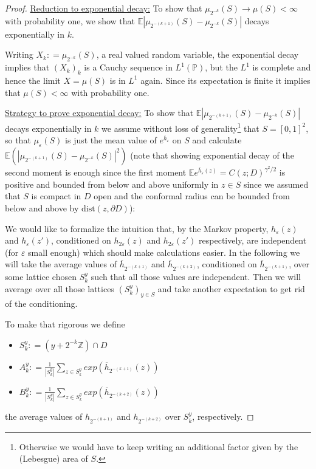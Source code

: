 \documentclass[11pt,reqno]{amsart}
\numberwithin{equation}{section}
\newcommand{\deq}{\mathrel{\mathop:}=}
\newcommand{\eps}{\varepsilon}
\begin{document}
\begin{proof}
	
	\underline{Reduction to exponential decay:} To show that $\mu_{2^{-k}}(S)\rightarrow\mu(S)<\infty$ with probability one, we show that $\mathbb E|\mu_{2^{-(k+1)}}(S)-\mu_{2^{-k}}(S)|$ decays exponentially in $k$.
	
	Writing $X_k\deq \mu_{2^{-k}}(S)$, a real valued random variable, the exponential decay implies that $(X_k)_k$ is a Cauchy sequence in $L^1(\mathbb P)$, but the $L^1$ is complete and hence the limit $X=\mu(S)$ is in $L^1$ again. Since its expectation is finite it implies that $\mu(S)<\infty$ with probability one.
	
	\underline{Strategy to prove exponential decay:} To show that $\mathbb E|\mu_{2^{-(k+1)}}(S)-\mu_{2^{-k}}(S)|$ decays exponentially in $k$ we assume without loss of generality\footnote{Otherwise we would have to keep writing an additional factor given by the (Lebesgue) area of $S$.} that $S=[0,1]^2$, so that $\mu_\eps(S)$ is just the mean value of $e^{\overline h_\eps}$ on $S$ and calculate $\mathbb E(|\mu_{2^{-(k+1)}}(S)-\mu_{2^{-k}}(S)|^2)$ (note that showing exponential decay of the second moment is enough since the first moment $\mathbb Ee^{\overline h_\eps(z)}=C(z;D)^{\gamma^2/2}$ is positive and bounded from below and above uniformly in $z\in S$ since we assumed that $S$ is compact in $D$ open and the conformal radius can be bounded from below and above by $\text{dist}(z,\partial D)$):
	
	We would like to formalize the intuition that, by the Markov property, $h_\eps(z)$ and $h_\eps(z')$, conditioned on $h_{2\eps}(z)$ and $h_{2\eps}(z')$ respectively, are independent (for $\eps$ small enough) which should make calculations easier. In the following we will take the average values of $\overline h_{2^{-(k+1)}}$ and $\overline h_{2^{-(k+2)}}$, conditioned on $\overline h_{2^{-(k+1)}}$, over some lattice chosen $S_k^y$ such that all those values are independent. Then we will average over all those lattices $(S_k^y)_{y\in S}$ and take another expectation to get rid of the conditioning.
	
	To make that rigorous we define \begin{itemize}
		\item $S_k^y\deq (y+2^{-k}\mathbb Z)\cap D$
		\item $A_k^y\deq \frac{1}{|S_k^y|}\sum_{z\in S_k^y}exp(\overline h_{2^{-(k+1)}}(z))$
		\item $B_k^y\deq \frac{1}{|S_k^y|}\sum_{z\in S_k^y}exp(\overline h_{2^{-(k+2)}}(z))$
	\end{itemize}
	the average values of $h_{2^{-(k+1)}}$ and $h_{2^{-(k+2)}}$ over $S_k^y$, respectively.
	

\end{proof}
\end{document}
